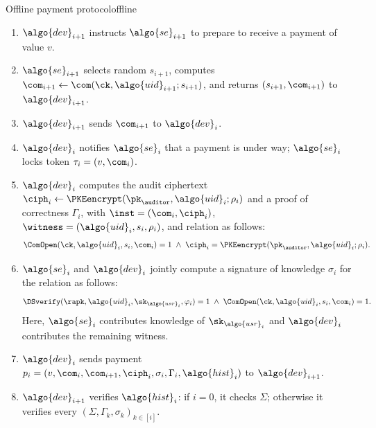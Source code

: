 \begin{protocolbox}{Offline payment protocol}{offline}
\begin{description}
\begin{enumerate}
        \item $\algo{dev}_{i+1}$ instructs $\algo{se}_{i+1}$ to prepare to
          receive a payment of value $v$.

        \item $\algo{se}_{i+1}$ selects random $s_{i+1}$, computes $\com_{i+1}
          \leftarrow \com(\ck, \algo{uid}_{i+1}; s_{i+1})$, and returns
          $(s_{i+1}, \com_{i+1})$ to $\algo{dev}_{i+1}$.

        \item $\algo{dev}_{i+1}$ sends $\com_{i+1}$ to $\algo{dev}_i$.

        \item $\algo{dev}_i$ notifies $\algo{se}_i$ that a payment is under
          way; $\algo{se}_i$ locks token $\tau_i = (v, \com_i)$.

        \item $\algo{dev}_i$ computes the audit ciphertext $\ciph_i \leftarrow
          \PKEencrypt(\pk_{\auditor}, \algo{uid}_i; \rho_i)$ and a proof of
          correctness $\Gamma_i$, with $\inst = (\com_i, \ciph_i)$, $\witness =
          (\algo{uid}_i, s_i, \rho_i)$, and relation as follows:
          \begin{equation*} \ComOpen(\ck, \algo{uid}_i, s_i, \com_i) = 1
          \;\wedge\; \ciph_i = \PKEencrypt(\pk_{\auditor}, \algo{uid}_i;
        \rho_i).  \end{equation*}

      \item $\algo{se}_i$ and $\algo{dev}_i$ jointly compute a signature of
        knowledge $\sigma_i$ for the relation as follows: \begin{equation*}
          \DSverify(\rapk, \algo{uid}_i, \sk_{\algo{usr}_i}, \varphi_i) = 1
          \;\wedge\; \ComOpen(\ck, \algo{uid}_i, s_i, \com_i) = 1.
        \end{equation*} Here, $\algo{se}_i$ contributes knowledge of
        $\sk_{\algo{usr}_i}$ and $\algo{dev}_i$ contributes the remaining
        witness.

      \item $\algo{dev}_i$ sends payment $p_i = (v, \com_i, \com_{i+1},
        \ciph_i, \sigma_i, \Gamma_i, \algo{hist}_i)$ to $\algo{dev}_{i+1}$.

      \item $\algo{dev}_{i+1}$ verifies $\algo{hist}_i$: if $i = 0$, it checks
        $\Sigma$; otherwise it verifies every $(\Sigma, \Gamma_k, \sigma_k)_{k
        \in [i]}$.


\end{enumerate}
\end{description}
\end{protocolbox}
